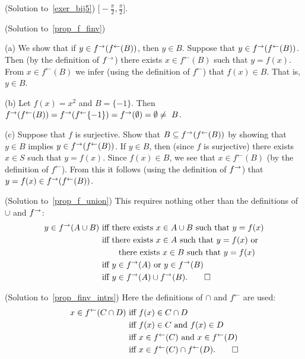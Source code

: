 \begin{prf}\label{sol_exer_bij5}(Solution to~\ref{exer_bij5})
$\bigl[-\frac\pi2, \frac\pi2\bigr]$.
\end{prf}

\begin{prf}\label{sol_prop_f_finv}(Solution to~\ref{prop_f_finv})

(a) We show that if $y \in f^{\rightarrow}(f^\gets(B))$, then $y \in B$.  Suppose that $y \in
f^{\rightarrow}(f^\gets(B))$. Then (by the definition of $f^{\rightarrow}$) there exists $x \in f^\gets(B)$
such that $y = f(x)$. From $x \in f^\gets(B)$ we infer (using the definition of $f^\gets$)
that $f(x) \in B$. That is, $y \in B$.

(b) Let $f(x) = x^2$ and $B = \{-1\}$. Then $f^{\rightarrow}(f^\gets(B)) = f^{\rightarrow}(f^\gets\{-1\}) =
f^{\rightarrow}(\emptyset) = \emptyset \ne~B$.

(c) Suppose that $f$ is surjective. Show that $ B \subseteq f^{\rightarrow}(f^\gets(B))$ by showing
that $y \in B$ implies $y \in f^{\rightarrow}(f^\gets(B))$.  If $y \in B$, then (since $f$ is
surjective) there exists $x \in S$ such that $y = f(x)$. Since $f(x) \in B$, we see that $x
\in f^\gets(B)$ (by the definition of $f^\gets$).  From this it follows (using the definition
of $f^{\rightarrow}$) that $y = f(x) \in f^{\rightarrow}(f^\gets(B))$. \qedhere
\end{prf}

\begin{prf}\label{sol_prop_f_union}(Solution to~\ref{prop_f_union})
This requires nothing other than the definitions of $\cup$ and $f^{\rightarrow}$:
 \begin{align*}
   y \in f^{\rightarrow}(A \cup B)
   &\text{ iff there exists $x \in A \cup B$ such that $y=f(x)$}\\
   &\text{ iff there exists $x \in A$ such that $y = f(x)$ or} \\
   &\qquad\text{ there exists $x \in B$ such that $y = f(x)$} \\
   &\text{ iff $y \in f^{\rightarrow}(A)$ or $y \in f^{\rightarrow}(B)$} \\
   &\text{ iff $y \in f^{\rightarrow}(A) \cup f^{\rightarrow}(B)$.}  \qedhere
   \end{align*}
\end{prf}

\begin{prf}\label{sol_prop_finv_intrs}(Solution to~\ref{prop_finv_intrs})
Here the definitions of $\cap$ and $f^\gets$ are used:
\begin{align*}
   x \in f^\gets(C \cap D)
   &\text{ iff $f(x) \in C \cap D$} \\
   &\text{ iff $f(x) \in C$ and $f(x) \in D$} \\
   &\text{ iff $x \in f^\gets(C)$ and $x \in f^\gets(D)$} \\
   &\text{ iff $x \in f^\gets(C) \cap f^\gets(D)$.}  \qedhere
\end{align*}
\end{prf}

